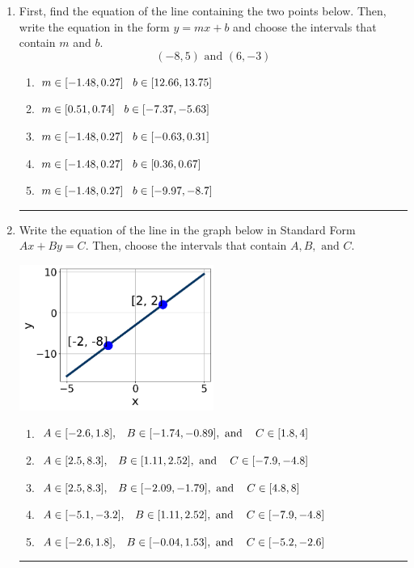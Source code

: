 \documentclass[14pt]{extbook}
\newcommand{\litem}[1]{\item#1\hspace*{-1cm}\rule{\textwidth}{0.4pt}}
\begin{document}
\begin{enumerate}
{\begin{enumerate}[label=\Alph*.]
\end{enumerate} }
\litem{
First, find the equation of the line containing the two points below. Then, write the equation in the form $ y=mx+b $ and choose the intervals that contain $m$ and $b$.\[ (-8, 5) \text{ and } (6, -3) \]\begin{enumerate}[label=\Alph*.]
\item \( m \in [-1.48, 0.27] \hspace*{3mm} b \in [12.66, 13.75] \)
\item \( m \in [0.51, 0.74] \hspace*{3mm} b \in [-7.37, -5.63] \)
\item \( m \in [-1.48, 0.27] \hspace*{3mm} b \in [-0.63, 0.31] \)
\item \( m \in [-1.48, 0.27] \hspace*{3mm} b \in [0.36, 0.67] \)
\item \( m \in [-1.48, 0.27] \hspace*{3mm} b \in [-9.97, -8.7] \)

\end{enumerate} }
\litem{
Write the equation of the line in the graph below in Standard Form $Ax+By=C$. Then, choose the intervals that contain $A, B, \text{ and } C$.
\begin{center}
    \includegraphics[width=0.5\textwidth]{../Figures/linearGraphToStandardB.png}
\end{center}
\begin{enumerate}[label=\Alph*.]
\item \( A \in [-2.6, 1.8], \hspace{3mm} B \in [-1.74, -0.89], \text{ and } \hspace{3mm} C \in [1.8, 4] \)
\item \( A \in [2.5, 8.3], \hspace{3mm} B \in [1.11, 2.52], \text{ and } \hspace{3mm} C \in [-7.9, -4.8] \)
\item \( A \in [2.5, 8.3], \hspace{3mm} B \in [-2.09, -1.79], \text{ and } \hspace{3mm} C \in [4.8, 8] \)
\item \( A \in [-5.1, -3.2], \hspace{3mm} B \in [1.11, 2.52], \text{ and } \hspace{3mm} C \in [-7.9, -4.8] \)
\item \( A \in [-2.6, 1.8], \hspace{3mm} B \in [-0.04, 1.53], \text{ and } \hspace{3mm} C \in [-5.2, -2.6] \)


\end{enumerate}}
\end{enumerate}
\end{document}
